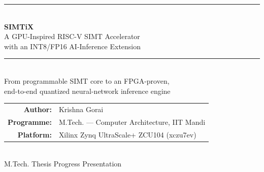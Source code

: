 \documentclass[aspectratio=169,11pt]{beamer}
\newcommand{\navy}[1]{{\color{simtixblue}\textbf{#1}}}
\begin{document}
{
\begin{frame}[plain]
  \vspace{0.6cm}
  \begin{center}
    {\color{simtixaccent}\rule{\textwidth}{1.2pt}}\\[0.5em]
    {\Huge\bfseries\color{simtixblue} SIMTiX}\\[0.35em]
    {\large\color{simtixblue} A GPU-Inspired RISC-V SIMT Accelerator\\
     with an INT8/FP16 AI-Inference Extension}\\[0.4em]
    {\color{simtixaccent}\rule{\textwidth}{1.2pt}}\\[1.1em]
    {\normalsize From programmable SIMT core to an FPGA-proven,\\
     end-to-end quantized neural-network inference engine}\\[1.4em]
    \begin{tabular}{rl}
      \navy{Author:}      & Krishna Gorai \\
      \navy{Programme:}   & M.Tech. --- Computer Architecture, IIT Mandi \\
      \navy{Platform:}    & Xilinx Zynq UltraScale+ ZCU104 (xczu7ev) \\
    \end{tabular}\\[1.1em]
    {\footnotesize M.Tech. Thesis Progress Presentation}
  \end{center}
\end{frame}
}
\end{document}
